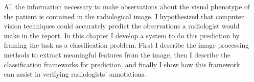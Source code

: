 All the information necessary to make observations about the visual phenotype of the patient is contained in the radiological image. 
I hypothesized that computer vision techniques could accurately predict the observations a radiologist would make in the report. 
In this chapter I develop a system to do this prediction by framing the task as a classification problem. 
First I describe the image processing methods to extract meaningful features from the image, then I describe the classification frameworks for prediction, and finally I show how this framework can assist in verifying radiologists' annotations.